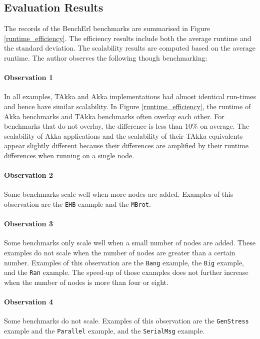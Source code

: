 \subsection{Evaluation Results}

The records of the BenchErl benchmarks are summarised in Figure 
\ref{runtime_efficiency}.  The efficiency results include both the average 
runtime and the standard deviation.  The scalability results are computed based 
on the average runtime.  The author observes the following though benchmarking:

\paragraph{Observation 1} In all examples, TAkka and Akka implementations had 
almost identical run-times and hence have similar scalability.  In Figure 
\ref{runtime_efficiency}, the runtime of Akka benchmarks and TAkka benchmarks 
often overlay each other.  For benchmarks that do not overlay, the 
difference is less than 10\% on average.  The scalability of Akka applications 
and the scalability of their TAkka equivalents appear slightly different 
because their differences are amplified by their runtime differences when 
running on a single node.

\paragraph{Observation 2} Some benchmarks scale well when more nodes are added. 
 Examples of this observation are the {\tt EHB} example and the {\tt MBrot}. 

\paragraph{Observation 3} Some benchmarks only scale well when a small number 
of nodes are added.  These examples do not scale when the number of nodes are 
greater than a certain number.  Examples of this observation are the {\tt Bang} 
example, the {\tt Big} example, and the {\tt Ran} example.  The speed-up of 
those examples does not further increase when the number of nodes is more than 
four or eight.  

\paragraph{Observation 4} Some benchmarks do not scale.  Examples of this 
observation are the {\tt GenStress} example and the {\tt Parallel} 
example, and the {\tt SerialMsg} example.




